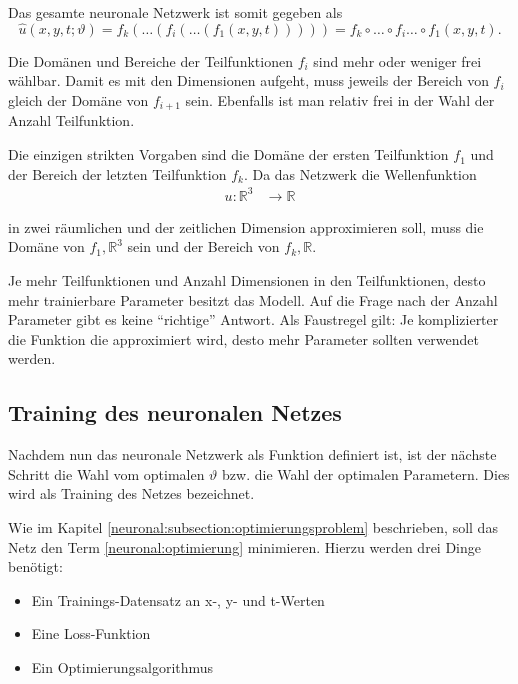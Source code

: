 Das gesamte neuronale Netzwerk ist somit gegeben als
\begin{equation}
    \hat{u}(x, y, t; \vartheta) = f_k(\ldots(f_i(\ldots(f_1(x, y, t))))) = f_k \circ \ldots \circ f_i \ldots \circ f_1(x, y, t).
    \label{neuronal:nn_ausformuliert}
\end{equation}

Die Domänen und Bereiche der Teilfunktionen \( f_i \) sind mehr oder weniger frei wählbar.
Damit es mit den Dimensionen aufgeht, muss jeweils der Bereich von \( f_i \) gleich der Domäne von \( f_{i+1} \) sein.
Ebenfalls ist man relativ frei in der Wahl der Anzahl Teilfunktion.

Die einzigen strikten Vorgaben sind die Domäne der ersten Teilfunktion \( f_1 \) und der Bereich der letzten Teilfunktion \( f_k \).
Da das Netzwerk die Wellenfunktion
\begin{align*}
    u\colon \mathbb{R}^3 & \longrightarrow\mathbb{R}
\end{align*}

in zwei räumlichen und der zeitlichen Dimension approximieren soll, muss die Domäne von \( f_1, \mathbb{R}^3\) sein und der Bereich von \( f_k, \mathbb{R}\).

Je mehr Teilfunktionen und Anzahl Dimensionen in den Teilfunktionen, desto mehr trainierbare Parameter besitzt das Modell.
Auf die Frage nach der Anzahl Parameter gibt es keine ``richtige'' Antwort.
Als Faustregel gilt: Je komplizierter die Funktion die approximiert wird, desto mehr Parameter sollten verwendet werden.



\subsection{Training des neuronalen Netzes}\label{neuronal:subsection:training_nn}

Nachdem nun das neuronale Netzwerk als Funktion definiert ist, ist der nächste Schritt die Wahl vom optimalen \( \vartheta \) bzw. die Wahl der optimalen Parametern.
Dies wird als Training des Netzes bezeichnet.

Wie im Kapitel \ref{neuronal:subsection:optimierungsproblem} beschrieben, soll das Netz den Term \eqref{neuronal:optimierung} minimieren.
Hierzu werden drei Dinge benötigt:
\begin{itemize}
    \item Ein Trainings-Datensatz an x-, y- und t-Werten
    \item Eine Loss-Funktion
    \item Ein Optimierungsalgorithmus\\
\end{itemize}

